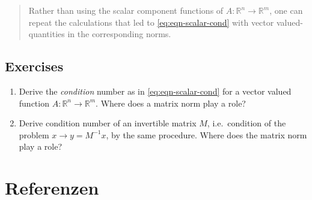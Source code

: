 \documentclass[
]{book}
\providecommand{\tightlist}{%
  \setlength{\itemsep}{0pt}\setlength{\parskip}{0pt}}
\newenvironment {JHSAYS} [0] {\begin{quote}\color{jhsc}} {\end{quote}}
\theoremstyle{definition}
\theoremstyle{definition}
\theoremstyle{definition}
\theoremstyle{definition}
\theoremstyle{remark}
\begin{document}
\leavevmode\hypertarget{rem-vector-valued-cond}{}%
\begin{JHSAYS}
Rather than using the scalar component functions of \(A\colon \mathbb R^{n} \to \mathbb R^{m}\), one can repeat the calculations that led to \eqref{eq:eqn-scalar-cond} with vector valued-quantities in the corresponding norms.

\end{JHSAYS}

\hypertarget{exercises-1}{%
\section{Exercises}\label{exercises-1}}

\begin{enumerate}
\def\labelenumi{\arabic{enumi}.}
\tightlist
\item
  Derive the \emph{condition} number as in \eqref{eq:eqn-scalar-cond} for a vector valued function \(A\colon \mathbb R^{n} \to \mathbb R^{m}\). Where does a matrix norm play a role?
\item
  Derive condition number of an invertible matrix \(M\), i.e.~condition of the problem \(x\to y = M^{-1}x\), by the same procedure. Where does the matrix norm play a role?
\end{enumerate}

\hypertarget{referenzen}{%
\chapter*{Referenzen}\label{referenzen}}
\end{document}
